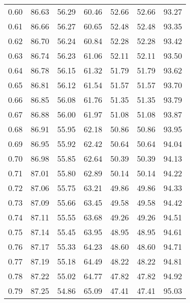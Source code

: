 \begin{tabular}{|c|c|c|c|c|c|c|}
      0.60 &     86.63 &     56.29 &      60.46 &   52.66 &      52.66 &         93.27 \\
      0.61 &     86.66 &     56.27 &      60.65 &   52.48 &      52.48 &         93.35 \\
      0.62 &     86.70 &     56.24 &      60.84 &   52.28 &      52.28 &         93.42 \\
      0.63 &     86.74 &     56.23 &      61.06 &   52.11 &      52.11 &         93.50 \\
      0.64 &     86.78 &     56.15 &      61.32 &   51.79 &      51.79 &         93.62 \\
      0.65 &     86.81 &     56.12 &      61.54 &   51.57 &      51.57 &         93.70 \\
      0.66 &     86.85 &     56.08 &      61.76 &   51.35 &      51.35 &         93.79 \\
      0.67 &     86.88 &     56.00 &      61.97 &   51.08 &      51.08 &         93.87 \\
      0.68 &     86.91 &     55.95 &      62.18 &   50.86 &      50.86 &         93.95 \\
      0.69 &     86.95 &     55.92 &      62.42 &   50.64 &      50.64 &         94.04 \\
      0.70 &     86.98 &     55.85 &      62.64 &   50.39 &      50.39 &         94.13 \\
      0.71 &     87.01 &     55.80 &      62.89 &   50.14 &      50.14 &         94.22 \\
      0.72 &     87.06 &     55.75 &      63.21 &   49.86 &      49.86 &         94.33 \\
      0.73 &     87.09 &     55.66 &      63.45 &   49.58 &      49.58 &         94.42 \\
      0.74 &     87.11 &     55.55 &      63.68 &   49.26 &      49.26 &         94.51 \\
      0.75 &     87.14 &     55.45 &      63.95 &   48.95 &      48.95 &         94.61 \\
      0.76 &     87.17 &     55.33 &      64.23 &   48.60 &      48.60 &         94.71 \\
      0.77 &     87.19 &     55.18 &      64.49 &   48.22 &      48.22 &         94.81 \\
      0.78 &     87.22 &     55.02 &      64.77 &   47.82 &      47.82 &         94.92 \\
      0.79 &     87.25 &     54.86 &      65.09 &   47.41 &      47.41 &         95.03 \\

\end{tabular}
